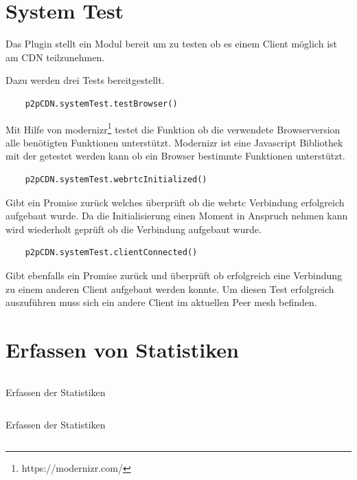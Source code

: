 \begin{description}
\section{System Test}\label{system-test}
Das Plugin stellt ein Modul bereit um zu testen ob es einem Client möglich ist am \pTp CDN teilzunehmen.

Dazu werden drei Tests bereitgestellt.
\begin{lstlisting}
	p2pCDN.systemTest.testBrowser()
\end{lstlisting}
 Mit Hilfe von modernizr\footnote{https://modernizr.com/} testet die Funktion ob die verwendete Browserversion alle benötigten Funktionen unterstützt. Modernizr ist eine Javascript Bibliothek mit der getestet werden kann ob ein Browser bestimmte Funktionen unterstützt.
\begin{lstlisting}
	p2pCDN.systemTest.webrtcInitialized()
\end{lstlisting}
Gibt ein Promise zurück welches überprüft ob die webrtc Verbindung erfolgreich aufgebaut wurde. Da die Initialisierung einen Moment in Anspruch nehmen kann wird wiederholt geprüft ob die Verbindung aufgebaut wurde.
\begin{lstlisting}
	p2pCDN.systemTest.clientConnected()
\end{lstlisting}
Gibt ebenfalls ein Promise zurück und überprüft ob erfolgreich eine Verbindung zu einem anderen Client aufgebaut werden konnte. Um diesen Test erfolgreich auszuführen muss sich ein andere Client im aktuellen Peer mesh befinden.

\section{Erfassen von Statistiken}\label{ch:implementation:stats}
\begin{listing}[h]
	\inputminted{javascript}{listings/sendStatistic.js}
	\caption{Erfassen der Statistiken}
	\label{lst:code-stats}
\end{listing}
\begin{listing}[h]
	\inputminted{javascript}{listings/logStatistic.js}
	\caption{Erfassen der Statistiken}
	\label{lst:code-stats}
\end{listing}

\begin{listing}[h]
	\inputminted{javascript}{listings/_handle_chunk.js}
	\caption{}
	\label{lst:handle_chunk}
\end{listing}


\end{description}
